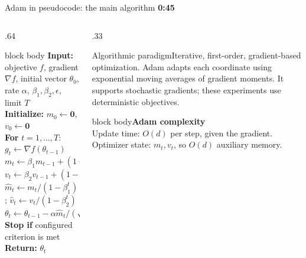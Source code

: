 \documentclass[aspectratio=169,10pt]{beamer}
\newcommand{\timing}[1]{\hfill{\color{teal}\scriptsize\bfseries #1}}
\begin{document}
\begin{frame}{Adam in pseudocode: the main algorithm \timing{0:45}}
\begin{columns}[T,onlytextwidth]
\begin{column}{.64\textwidth}
\begin{beamercolorbox}[rounded=true,sep=.35em,wd=\linewidth]{block body}
\scriptsize\textbf{Input:} objective $f$, gradient $\nabla f$, initial vector $\theta_0$, rate $\alpha$, $\beta_1,\beta_2,\epsilon$, limit $T$\\
\textbf{Initialize:} $m_0\gets\mathbf0$, $v_0\gets\mathbf0$\\
\textbf{For} $t=1,\ldots,T$:\\
\hspace{1em}$g_t\gets\nabla f(\theta_{t-1})$\\
\hspace{1em}$m_t\gets\beta_1m_{t-1}+(1-\beta_1)g_t$\\
\hspace{1em}$v_t\gets\beta_2v_{t-1}+(1-\beta_2)(g_t\odot g_t)$\\
\hspace{1em}$\widehat m_t\gets m_t/(1-\beta_1^t)$; $\widehat v_t\gets v_t/(1-\beta_2^t)$\\
\hspace{1em}$\theta_t\gets\theta_{t-1}-\alpha\widehat m_t/(\sqrt{\widehat v_t}+\epsilon)$\\
\hspace{1em}\textbf{Stop if} configured criterion is met\\
\textbf{Return:} $\theta_t$
\end{beamercolorbox}
\end{column}
\begin{column}{.33\textwidth}
\begin{block}{Algorithmic paradigm}\small Iterative, first-order, gradient-based optimization. Adam adapts each coordinate using exponential moving averages of gradient moments. It supports stochastic gradients; these experiments use deterministic objectives.\end{block}
\begin{beamercolorbox}[rounded=true,sep=.55em,wd=\linewidth]{block body}\textbf{Adam complexity}\\[.25em]\small Update time: $O(d)$ per step, given the gradient.\\[.25em]Optimizer state: $m_t,v_t$, so $O(d)$ auxiliary memory.\end{beamercolorbox}

\end{column}
\end{columns}
\end{frame}
\end{document}

